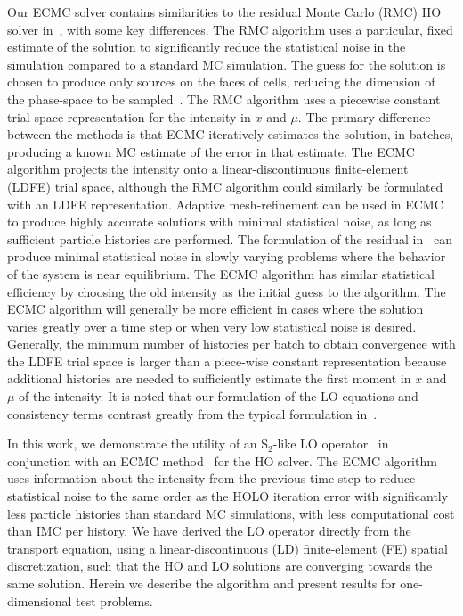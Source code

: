 \documentclass[12pt]{article}
\begin{document}
\begin{center}
Our ECMC solver contains similarities to the residual Monte Carlo (RMC) HO solver
in~\cite{rmc}, with some key differences.  The RMC algorithm uses a particular, fixed 
estimate of the solution to significantly reduce the statistical noise in the
simulation compared to a standard MC simulation. The guess for the solution is chosen to produce only sources on the faces of
cells, reducing the dimension of the phase-space to be sampled~\cite{rmc}. The RMC
algorithm  uses a piecewise constant trial space representation for the intensity in
$x$ and $\mu$.
The primary difference between the methods is that ECMC iteratively estimates the
solution, in batches, producing a known MC estimate
of the error in that estimate.  The ECMC algorithm projects the intensity onto a linear-discontinuous
finite-element (LDFE) trial space, although the RMC
algorithm could similarly be formulated with an LDFE representation.  Adaptive
mesh-refinement can be used in ECMC to produce highly accurate solutions with minimal
statistical noise, as long as sufficient particle histories are performed. 
The formulation of the residual in~\cite{rmc} can produce minimal
statistical noise in slowly varying problems where the behavior of the system is near
equilibrium. The ECMC algorithm has
similar statistical efficiency by choosing the old intensity as the initial guess to
the algorithm.  The ECMC algorithm will generally be more efficient in cases where
the solution varies greatly over a time step or when very low statistical noise is
desired.  Generally, the minimum number of histories per batch to obtain convergence with the
LDFE trial space is larger than a piece-wise constant representation because additional
histories are needed to sufficiently estimate the first moment in $x$ and $\mu$ of the
intensity. It is noted that our formulation of the LO
equations and consistency terms contrast greatly from the typical formulation
in~\cite{rmc,willert,park}.  

In this work, we demonstrate the utility of an S$_2$-like LO operator~\cite{wolters}
in conjunction with an ECMC method~\cite{jake} for the HO solver.
The ECMC algorithm uses information about the intensity from the previous time step to reduce statistical noise to the same order as
the HOLO iteration error with significantly less particle histories than standard MC
simulations, with less computational cost than IMC per history.  We have derived the LO operator directly from the transport
equation, using a linear-discontinuous (LD) finite-element (FE) spatial
discretization, such that the HO and LO solutions are converging towards the same
solution. Herein we describe the algorithm and present results for one-dimensional test problems.


\end{center}
\end{document}
